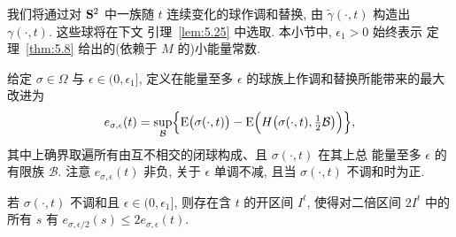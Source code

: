 我们将通过对 $\mathbf{S}^2$ 中一族随 $t$ 连续变化的球作调和替换, 由
$\tilde{\gamma}(\cdot,t)$ 构造出 $\gamma(\cdot,t)$. 这些球将在下文
引理~\ref{lem:5.25} 中选取. 本小节中, $\epsilon_1>0$ 始终表示
定理~\ref{thm:5.8} 给出的(依赖于 $M$ 的)小能量常数.

给定 $\sigma\in\Omega$ 与 $\epsilon\in(0,\epsilon_1]$, 定义在能量至多
$\epsilon$ 的球族上作调和替换所能带来的最大改进为
\begin{equation}
e_{\sigma,\epsilon}(t)=\sup_{\mathcal{B}}\Bigl\{
\mathrm{E}\bigl(\sigma(\cdot,t)\bigr)
-\mathrm{E}\Bigl(H\bigl(\sigma(\cdot,t),\tfrac12\mathcal{B}\bigr)\Bigr)
\Bigr\},
\label{eq:5.102}
\end{equation}
其中上确界取遍所有由互不相交的闭球构成、且 $\sigma(\cdot,t)$ 在其上总
能量至多 $\epsilon$ 的有限族 $\mathcal{B}$. 注意
$e_{\sigma,\epsilon}(t)$ 非负, 关于 $\epsilon$ 单调不减, 且当
$\sigma(\cdot,t)$ 不调和时为正.

\begin{lemma}
\label{lem:5.24}
若 $\sigma(\cdot,t)$ 不调和且 $\epsilon\in(0,\epsilon_1]$, 则存在含
$t$ 的开区间 $I^t$, 使得对二倍区间 $2I^t$ 中的所有 $s$ 有
$e_{\sigma,\epsilon/2}(s)\leq 2e_{\sigma,\epsilon}(t)$.
\end{lemma}

